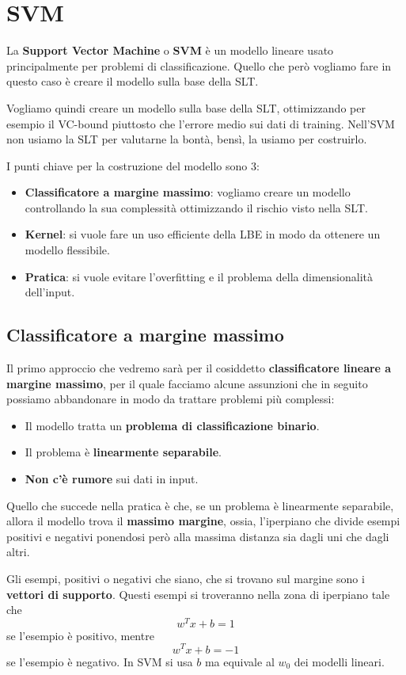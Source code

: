\chapter{SVM}
La \textbf{Support Vector Machine} o \textbf{SVM} \`e un modello lineare usato principalmente per problemi di
classificazione. Quello che per\`o vogliamo fare in questo caso \`e creare il modello sulla base della SLT.

Vogliamo quindi creare un modello sulla base della SLT, ottimizzando per esempio il VC-bound piuttosto che l'errore medio
sui dati di training. Nell'SVM non usiamo la SLT per valutarne la bont\`a, bens\`i, la usiamo per costruirlo.

I punti chiave per la costruzione del modello sono 3:
\begin{itemize}
	\item \textbf{Classificatore a margine massimo}: vogliamo creare un modello controllando la sua complessit\`a
	      ottimizzando il rischio visto nella SLT.
	\item \textbf{Kernel}: si vuole fare un uso efficiente della LBE in modo da ottenere un modello flessibile.
	\item \textbf{Pratica}: si vuole evitare l'overfitting e il problema della dimensionalit\`a dell'input.
\end{itemize}

\section{Classificatore a margine massimo}
Il primo approccio che vedremo sar\`a per il cosiddetto \textbf{classificatore lineare a margine massimo}, per il quale
facciamo alcune assunzioni che in seguito possiamo abbandonare in modo da trattare problemi pi\`u complessi:
\begin{itemize}
	\item Il modello tratta un \textbf{problema di classificazione binario}.
	\item Il problema \`e \textbf{linearmente separabile}.
	\item \textbf{Non c'\`e rumore} sui dati in input.
\end{itemize}
Quello che succede nella pratica \`e che, se un problema \`e linearmente separabile, allora il modello trova il
\textbf{massimo margine}, ossia, l'iperpiano che divide esempi positivi e negativi ponendosi per\`o alla massima distanza
sia dagli uni che dagli altri.

Gli esempi, positivi o negativi che siano, che si trovano sul margine sono i \textbf{vettori di supporto}. Questi esempi si
troveranno nella zona di iperpiano tale che
\[ w^T x + b = 1 \]
se l'esempio \`e positivo, mentre
\[ w^T x + b = -1 \]
se l'esempio \`e negativo. In SVM si usa $b$ ma equivale al $w_0$ dei modelli lineari.

